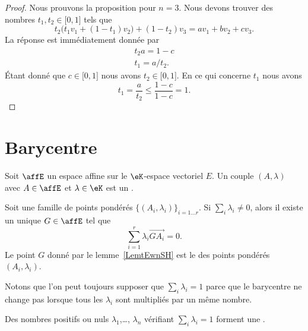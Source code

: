 \begin{proof}
	Nous prouvons la proposition pour \( n=3\). Nous devons trouver des nombres \( t_1,t_2\in \mathopen[ 0 , 1 \mathclose]\) tels que
	\begin{equation}
		t_2\big( t_1v_1+(1-t_1)v_2 \big)+(1-t_2)v_3=av_1+bv_2+cv_3.
	\end{equation}
	La réponse est immédiatement donnée par
	\begin{subequations}
		\begin{align}
			t_2a=1-c \\
			t_1=a/t_2.
		\end{align}
	\end{subequations}
	Étant donné que \( c\in \mathopen[ 0 , 1 \mathclose]\) nous avons \( t_2\in\mathopen[ 0 , 1 \mathclose]\). En ce qui concerne \( t_1\) nous avons
	\begin{equation}
		t_1=\frac{ a }{ t_2 }\leq \frac{ 1-c }{ 1-c }=1.
	\end{equation}
\end{proof}

\section{Barycentre}

Soit \( \affE\) un espace affine sur le \( \eK\)-espace vectoriel \( E\). Un couple \( (A,\lambda)\) avec \( A\in \affE\) et \( \lambda\in \eK\) est un .

\begin{lemmaDef}        \label{LemtEwnSH}
	Soit une famille de points pondérés \( \{ (A_i,\lambda_i) \}_{i=1\ldots r}\). Si \( \sum_i\lambda_i\neq 0\), alors il existe un unique \( G\in \affE\) tel que
	\begin{equation}
		\sum_{i=1}^r\lambda_i\overrightarrow{ GA_i }=0.
	\end{equation}
	Le point \( G\) donné par le lemme~\ref{LemtEwnSH} est le  des points pondérés \( (A_i,\lambda_i)\).
\end{lemmaDef}


Notons que l'on peut toujours supposer que \( \sum_i\lambda_i=1\) parce que le barycentre ne change pas lorsque tous les \( \lambda_i\) sont multipliés par un même nombre.
\begin{definition}\label{DefIMZooLFdIUB}
	Des nombres positifs ou nuls \( \lambda_1\),\ldots, \( \lambda_n\) vérifiant \( \sum_i\lambda_i=1\) forment une .
\end{definition}

